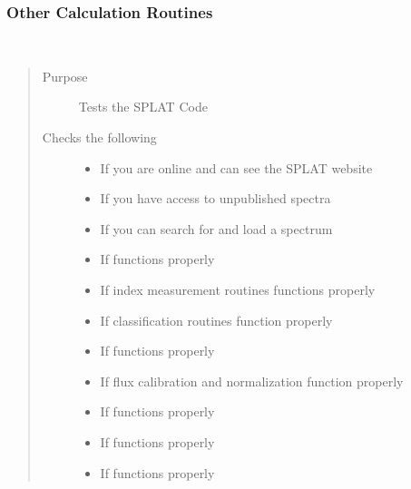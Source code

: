 \documentclass[letterpaper,10pt,english]{sphinxmanual}
\begin{document}
\subsubsection{Other Calculation Routines}
\label{api:other-calculation-routines}

\begin{fulllineitems}
\label{api:splat.test}~\begin{quote}\begin{description}
\item[{Purpose}] \leavevmode
Tests the SPLAT Code

\item[{Checks the following}] \leavevmode\begin{itemize}
\item {} 
If you are online and can see the SPLAT website

\item {} 
If you have access to unpublished spectra

\item {} 
If you can search for and load a spectrum

\item {} 
If  functions properly

\item {} 
If index measurement routines functions properly

\item {} 
If classification routines function properly

\item {} 
If  functions properly

\item {} 
If flux calibration and normalization function properly

\item {} 
If  functions properly

\item {} 
If  functions properly

\item {} 
If  functions properly

\end{itemize}

\end{description}\end{quote}

\end{fulllineitems}
\end{document}
